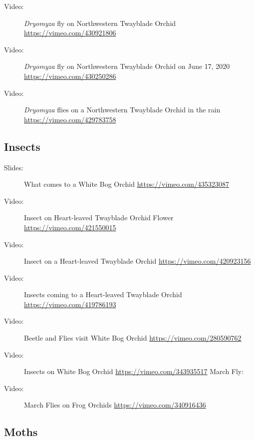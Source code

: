 \begin{description}
\item[Video:]  \emph{Dryomyza} fly on Northwestern Twayblade Orchid \url{https://vimeo.com/430921806}
\item[Video:]  \emph{Dryomyza} fly on Northwestern Twayblade Orchid on June 17, 2020 \url{https://vimeo.com/430250286}
\item[Video:]  \emph{Dryomyza} flies on a Northwestern Twayblade Orchid in the rain \url{https://vimeo.com/429783758}
\end{description}

\subsection{Insects}

\begin{description}
\item[Slides:] What comes to a White Bog Orchid \url{https://vimeo.com/435323087} 
\item[Video:]  Insect on Heart-leaved Twayblade Orchid Flower \url{https://vimeo.com/421550015}
\item[Video:]  Insect on a Heart-leaved Twayblade Orchid \url{https://vimeo.com/420923156}
\item[Video:]  Insects coming to a Heart-leaved Twayblade Orchid \url{https://vimeo.com/419786193}
\item[Video:]  Beetle and Flies visit White Bog Orchid \url{https://vimeo.com/280590762}
\item[Video:]  Insects on White Bog Orchid \url{https://vimeo.com/343935517}
March Fly:
\item[Video:]  March Flies on Frog Orchids \url{https://vimeo.com/340916436}
\end{description}

\subsection{Moths}

